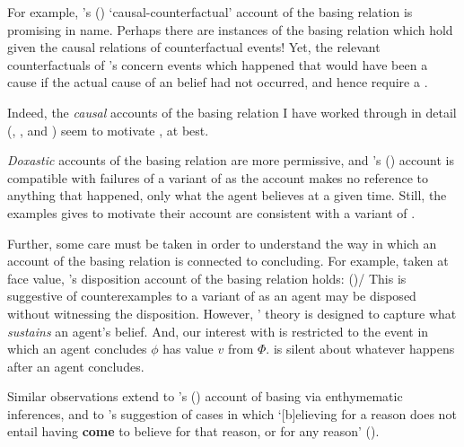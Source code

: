 \begin{note}
{    For example, \citeauthor{Swain:1981wd}'s (\citeyear{Swain:1981wd}) `causal-counterfactual' account of the basing relation is promising in name.
    Perhaps there are instances of the basing relation which hold given the causal relations of counterfactual events!
    Yet, the relevant counterfactuals of \citeauthor{Swain:1981wd}'s concern events which happened that would have been a cause if the actual cause of an \agents{} belief had not occurred, and hence require a .

    Indeed, the \emph{causal} accounts of the basing relation I have worked through in detail (\cite{Moser:1989tv}, \cite{Ye:2020ux}, and \cite{Turri:2011aa}) seem to motivate \issueInclusion{}, at best.

    \emph{Doxastic} accounts of the basing relation are more permissive, and \citeauthor{Tolliver:1982us}'s (\citeyear{Tolliver:1982us}) account is compatible with failures of a variant of \issueInclusion{} as the account makes no reference to anything that happened, only what the agent believes at a given time.
    Still, the examples \citeauthor{Tolliver:1982us} gives to motivate their account are consistent with a variant of \issueInclusion{}.

    Further, some care must be taken in order to understand the way in which an account of the basing relation is connected to concluding.
    For example, taken at face value, \citeauthor{Evans:2013tw}'s disposition account of the basing relation holds:
     (\citeyear[2952]{Evans:2013tw})/
  This is suggestive of counterexamples to a variant of \issueInclusion{} as an agent may be disposed without witnessing the disposition.
  However, \citeauthor{Evans:2013tw}' theory is designed to capture what \emph{sustains} an agent's belief.%
  And, our interest with \issueInclusion{} is restricted to the event in which an agent concludes \(\phi\) has value \(v\) from \(\Phi\).
  \issueInclusion{} is silent about whatever happens after an agent concludes.

  Similar observations extend to \citeauthor{Moretti:2019wx}'s (\citeyear{Moretti:2019wx}) account of basing via enthymematic inferences, and to  \citeauthor{Audi:1986to}'s suggestion of cases in which `[b]elieving for a reason does not entail having \textbf{come} to believe for that reason, or for any reason' (\citeyear[32--33]{Audi:1986to}).
  }
\end{note}

